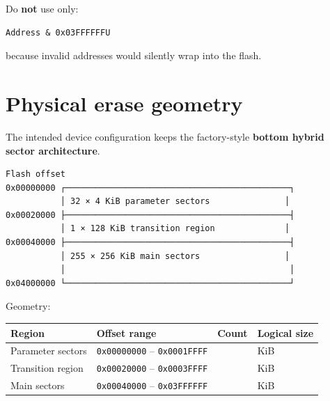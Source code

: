 \documentclass[10pt,a4paper,oneside]{report}
\begin{document}
Do \textbf{not} use only:

\begin{verbatim}
Address & 0x03FFFFFFU
\end{verbatim}

because invalid addresses would silently wrap into the flash.

\section{Physical erase geometry}\label{wiki-reference-flash-layout-proposal--2-physical-erase-geometry}

The intended device configuration keeps the factory-style \textbf{bottom hybrid sector architecture}.

\begin{verbatim}
Flash offset
0x00000000 ┌─────────────────────────────────────────────┐
           │ 32 × 4 KiB parameter sectors               │
0x00020000 ├─────────────────────────────────────────────┤
           │ 1 × 128 KiB transition region              │
0x00040000 ├─────────────────────────────────────────────┤
           │ 255 × 256 KiB main sectors                 │
           │                                             │
0x04000000 └─────────────────────────────────────────────┘
\end{verbatim}

Geometry:

{\def\LTcaptype{none} %
\begin{longtable}[]{@{}
  >{\raggedright\arraybackslash}p{}
  >{\raggedleft\arraybackslash}p{}
  >{\raggedleft\arraybackslash}p{}
  >{\raggedleft\arraybackslash}p{}@{}}
\toprule\noalign{}
\begin{minipage}[b]{\linewidth}\raggedright
\textbf{Region}
\end{minipage} & \begin{minipage}[b]{\linewidth}\raggedleft
\textbf{Offset range}
\end{minipage} & \begin{minipage}[b]{\linewidth}\raggedleft
\textbf{Count}
\end{minipage} & \begin{minipage}[b]{\linewidth}\raggedleft
\textbf{Logical size}
\end{minipage} \\
\midrule\noalign{}
\endhead
\bottomrule\noalign{}
\endlastfoot
Parameter sectors & \texttt{0x00000000} -- \texttt{0x0001FFFF} & 32 & 4 KiB \\
Transition region & \texttt{0x00020000} -- \texttt{0x0003FFFF} & 1 & 128 KiB \\
Main sectors & \texttt{0x00040000} -- \texttt{0x03FFFFFF} & 255 & 256 KiB \\
\end{longtable}
}
\end{document}
